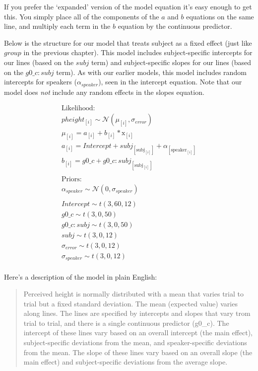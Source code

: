 \documentclass[
]{book}
\begin{document}
If you prefer the `expanded' version of the model equation it's easy enough to get this. You simply place all of the components of the \(a\) and \(b\) equations on the same line, and multiply each term in the \(b\) equation by the continuous predictor.

Below is the structure for our model that treats subject as a fixed effect (just like \(group\) in the previous chapter). This model includes subject-specific intercepts for our lines (based on the \(subj\) term) and subject-specific slopes for our lines (based on the \(g0\_c \colon subj\) term). As with our earlier models, this model includes random intercepts for speakers (\(\alpha_{speaker}\)), seen in the intercept equation. Note that our model does \emph{not} include any random effects in the slopes equation.

\begin{equation}
\begin{split}
\textrm{Likelihood:} \\
pheight_{[i]} \sim \mathcal{N}(\mu_{[i]},\sigma_{error}) \\
\mu_{[i]} = a_{[i]} + b_{[i]} * \mathrm{x}_{[i]}  \\ 
a_{[i]} = Intercept + subj_{[\mathrm{subj}_{[i]}]} + \alpha_{[\mathrm{speaker}_{[i]}]}  \\
b_{[i]} =  g0\_c + g0\_c \colon subj_{[\mathrm{subj}_{[i]}]} \\ \\
\textrm{Priors:} \\
\alpha_{speaker} \sim \mathcal{N}(0,\sigma_{speaker}) \\ \\ 
Intercept \sim t(3, 60, 12) \\
g0\_c \sim t(3, 0, 50) \\ 
g0\_c \colon subj \sim t(3, 0, 50) \\ 
subj \sim t(3, 0, 12) \\ 
\sigma_{error} \sim t(3, 0, 12) \\
\sigma_{speaker} \sim t(3, 0, 12) \\ 
\end{split}
\label{eq:65}
\end{equation}

Here's a description of the model in plain English:

\begin{quote}
Perceived height is normally distributed with a mean that varies trial to trial but a fixed standard deviation. The mean (expected value) varies along lines. The lines are specified by intercepts and slopes that vary trom trial to trial, and there is a single continuous predictor (g0\_c). The intercept of these lines vary based on an overall intercept (the main effect), subject-specific deviations from the mean, and speaker-specific deviations from the mean. The slope of these lines vary based on an overall slope (the main effect) and subject-specific deviations from the average slope.
\end{quote}
\end{document}
